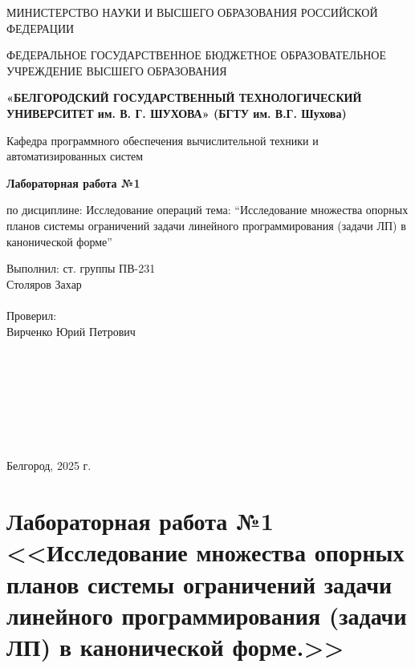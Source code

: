\documentclass{report}
\newcommand{\q}[1]{``#1''}
\begin{document}
	\begin{titlepage}
		\begin{center}
			МИНИСТЕРСТВО НАУКИ И ВЫСШЕГО ОБРАЗОВАНИЯ\linebreak 
			РОССИЙСКОЙ ФЕДЕРАЦИИ\medskip
			
			ФЕДЕРАЛЬНОЕ ГОСУДАРСТВЕННОЕ БЮДЖЕТНОЕ ОБРАЗОВАТЕЛЬНОЕ 
			УЧРЕЖДЕНИЕ ВЫСШЕГО ОБРАЗОВАНИЯ\medskip
			
			\textbf{
				«БЕЛГОРОДСКИЙ ГОСУДАРСТВЕННЫЙ \linebreak
				ТЕХНОЛОГИЧЕСКИЙ УНИВЕРСИТЕТ им. В. Г. ШУХОВА»\linebreak
				(БГТУ им. В.Г. Шухова)
			}\bigskip
			
			Кафедра программного обеспечения вычислительной техники и автоматизированных систем
			\vspace{5cm}
			
			\Large\textbf{Лабораторная работа №1}
			
			\large по дисциплине: Исследование операций\linebreak
			тема: \q{Исследование множества опорных планов системы ограничений
				задачи линейного программирования (задачи ЛП) в канонической
				форме}
		\end{center}\vspace{6cm}
		
		\begin{flushright}
			\begin{minipage}{7cm}
				Выполнил: ст. группы ПВ-231\\
				Столяров Захар\\
				\\
				Проверил: \\
				Вирченко Юрий Петрович\\
			\end{minipage}
		\end{flushright}\bigskip
		
		\
		
		\
		
		\
		
		\
		
		
		\begin{center}
			Белгород, 2025 г.
		\end{center}
	\end{titlepage}
	
	\newpage
	
	\setcounter{secnumdepth}{-1}
	\chapter{Лабораторная работа №1 <<Исследование множества опорных планов системы ограничений
		задачи линейного программирования (задачи ЛП) в канонической
		форме.>>}
	
\end{document}
